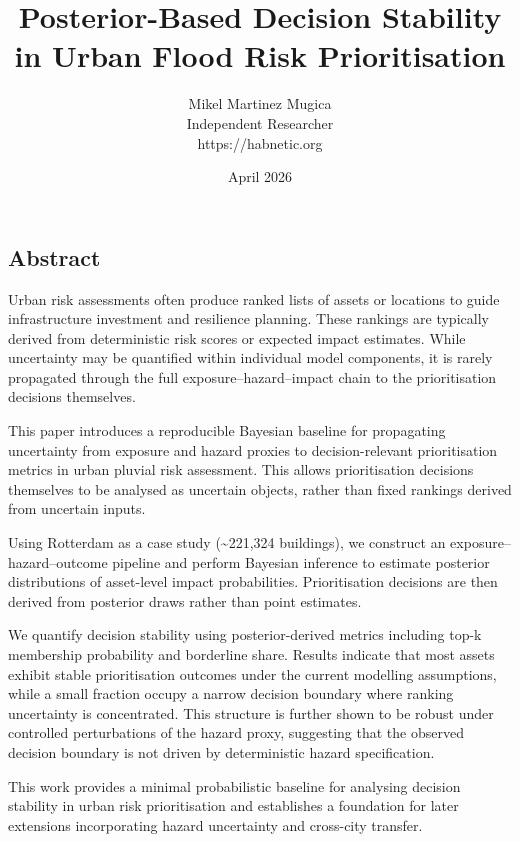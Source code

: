 \documentclass[
]{article}
\title{Posterior-Based Decision Stability in Urban Flood Risk
Prioritisation}
\author{Mikel Martinez Mugica\\
Independent Researcher\\
https://habnetic.org}
\date{April 2026}
\begin{document}
\maketitle

\maketitle

\subsection{Abstract}\label{abstract}

Urban risk assessments often produce ranked lists of assets or locations
to guide infrastructure investment and resilience planning. These
rankings are typically derived from deterministic risk scores or
expected impact estimates. While uncertainty may be quantified within
individual model components, it is rarely propagated through the full
exposure--hazard--impact chain to the prioritisation decisions
themselves.

This paper introduces a reproducible Bayesian baseline for propagating
uncertainty from exposure and hazard proxies to decision-relevant
prioritisation metrics in urban pluvial risk assessment. This allows
prioritisation decisions themselves to be analysed as uncertain objects,
rather than fixed rankings derived from uncertain inputs.

Using Rotterdam as a case study (\textasciitilde221,324 buildings), we
construct an exposure--hazard--outcome pipeline and perform Bayesian
inference to estimate posterior distributions of asset-level impact
probabilities. Prioritisation decisions are then derived from posterior
draws rather than point estimates.

We quantify decision stability using posterior-derived metrics including
top-k membership probability and borderline share. Results indicate that
most assets exhibit stable prioritisation outcomes under the current
modelling assumptions, while a small fraction occupy a narrow decision
boundary where ranking uncertainty is concentrated. This structure is
further shown to be robust under controlled perturbations of the hazard
proxy, suggesting that the observed decision boundary is not driven by
deterministic hazard specification.

This work provides a minimal probabilistic baseline for analysing
decision stability in urban risk prioritisation and establishes a
foundation for later extensions incorporating hazard uncertainty and
cross-city transfer.
\end{document}
